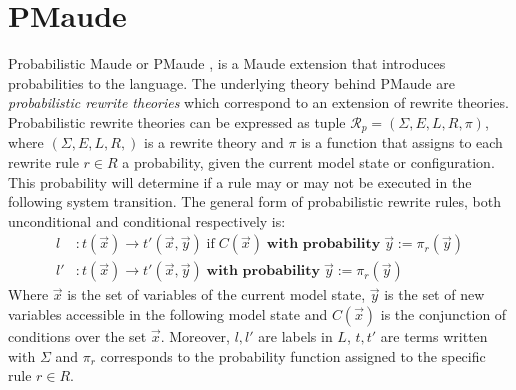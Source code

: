 \section{PMaude}
Probabilistic Maude or PMaude \cite{Agha2006}, is a Maude extension that introduces probabilities to the language. The underlying theory behind PMaude are  \textit{probabilistic rewrite theories} which correspond to an extension of rewrite theories. Probabilistic rewrite theories can be expressed as tuple $\mathscr{R}_p = (\Sigma, E, L, R, \pi)$, where $(\Sigma, E, L, R,)$ is a rewrite theory and $\pi$ is a function that assigns to each rewrite rule $r \in R$ a probability, given the current model state or configuration. This probability will determine if a rule may or may not be executed in the following system transition. The general form of probabilistic rewrite rules, both unconditional and conditional respectively is:
\begin{align*}
    l &: t(\overrightarrow{x}) \rightarrow t'(\overrightarrow{x}, \overrightarrow{y}) \; \text{if} \; C(\overrightarrow{x}) \; \textbf{with probability} \; \overrightarrow{y} := \pi_r(\overrightarrow{y}) \\
    l' &: t(\overrightarrow{x}) \rightarrow t'(\overrightarrow{x}, \overrightarrow{y}) \; \textbf{with probability} \; \overrightarrow{y} := \pi_r(\overrightarrow{y})  
\end{align*}
Where $\overrightarrow{x}$ is the set of variables of the current model state,  $\overrightarrow{y}$ is the set of new variables accessible in the following model state and $C(\overrightarrow{x})$ is the conjunction of conditions over the set $\overrightarrow{x}$. Moreover, $l, l'$ are labels in $L$, $t,t'$ are terms written with $\Sigma$ and $\pi_r$ corresponds to the probability function assigned to the specific rule $r \in R$. 


